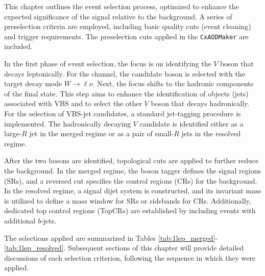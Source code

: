
This chapter outlines the event selection process, optimized to enhance the expected significance of the signal relative to the background.
A series of preselection criteria are employed, including basic quality cuts (event cleaning) and trigger requirements. The preselection cuts applied in the \texttt{CxAODMaker} are included.

In the first phase of event selection, the focus is on identifying the $V$ boson that decays leptonically. For the \olep channel, the candidate boson is selected with the target decay mode $W \to \ell \nu$.
Next, the focus shifts to the hadronic components of the final state. This step aims to enhance the identification of objects (jets) associated with VBS and to select the other $V$ boson that decays hadronically.
For the selection of VBS-jet candidates, a standard jet-tagging procedure is implemented. The hadronically decaying $V$ candidate is identified either as a large-$R$ jet in the merged regime or as a pair of small-$R$ jets in the resolved regime.

After the two bosons are identified, topological cuts are applied to further reduce the background. In the merged regime, the boson tagger defines the signal regions (SRs), and a reversed cut specifies the control regions (CRs) for the \Vjets background. 
In the resolved regime, a signal dijet system is constructed, and its invariant mass is utilized to define a mass window for SRs or sidebands for \Vjets CRs.
Additionally, dedicated top control regions (TopCRs) are established by including events with additional $b$-jets.

The selections applied are summarized in Tables
\ref{tab:1lep_merged}-\ref{tab:1lep_resolved}.
Subsequent sections of this chapter will provide detailed discussions of each selection criterion, following the sequence in which they were applied.


